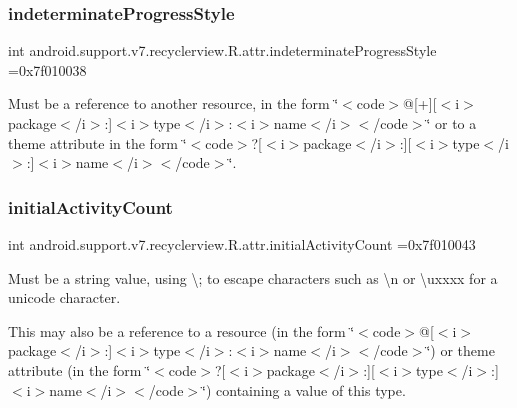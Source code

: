 \subsubsection{\texorpdfstring{indeterminate\+Progress\+Style}{indeterminateProgressStyle}}
{\footnotesize\ttfamily int android.\+support.\+v7.\+recyclerview.\+R.\+attr.\+indeterminate\+Progress\+Style =0x7f010038\hspace{0.3cm}{\ttfamily [static]}}

Must be a reference to another resource, in the form \char`\"{}$<$code$>$@\mbox{[}+\mbox{]}\mbox{[}$<$i$>$package$<$/i$>$\+:\mbox{]}$<$i$>$type$<$/i$>$\+:$<$i$>$name$<$/i$>$$<$/code$>$\char`\"{} or to a theme attribute in the form \char`\"{}$<$code$>$?\mbox{[}$<$i$>$package$<$/i$>$\+:\mbox{]}\mbox{[}$<$i$>$type$<$/i$>$\+:\mbox{]}$<$i$>$name$<$/i$>$$<$/code$>$\char`\"{}. \mbox{\label{classandroid_1_1support_1_1v7_1_1recyclerview_1_1R_1_1attr_a173231c7914b20a353937cf417309caa}} 
\subsubsection{\texorpdfstring{initial\+Activity\+Count}{initialActivityCount}}
{\footnotesize\ttfamily int android.\+support.\+v7.\+recyclerview.\+R.\+attr.\+initial\+Activity\+Count =0x7f010043\hspace{0.3cm}{\ttfamily [static]}}

Must be a string value, using \textquotesingle{}\textbackslash{};\textquotesingle{} to escape characters such as \textquotesingle{}\textbackslash{}n\textquotesingle{} or \textquotesingle{}\textbackslash{}uxxxx\textquotesingle{} for a unicode character. 

This may also be a reference to a resource (in the form \char`\"{}$<$code$>$@\mbox{[}$<$i$>$package$<$/i$>$\+:\mbox{]}$<$i$>$type$<$/i$>$\+:$<$i$>$name$<$/i$>$$<$/code$>$\char`\"{}) or theme attribute (in the form \char`\"{}$<$code$>$?\mbox{[}$<$i$>$package$<$/i$>$\+:\mbox{]}\mbox{[}$<$i$>$type$<$/i$>$\+:\mbox{]}$<$i$>$name$<$/i$>$$<$/code$>$\char`\"{}) containing a value of this type. \mbox{\label{classandroid_1_1support_1_1v7_1_1recyclerview_1_1R_1_1attr_a45c9d37327950d0fc24ae25e3c3dabf7}} 

